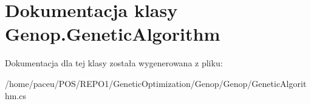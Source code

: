 \hypertarget{classGenop_1_1GeneticAlgorithm}{}\section{Dokumentacja klasy Genop.\+Genetic\+Algorithm}
\label{classGenop_1_1GeneticAlgorithm}


Dokumentacja dla tej klasy została wygenerowana z pliku\+:\begin{DoxyCompactItemize}
\item 
/home/paceu/\+P\+O\+S/\+R\+E\+P\+O1/\+Genetic\+Optimization/\+Genop/\+Genop/Genetic\+Algorithm.\+cs\end{DoxyCompactItemize}

